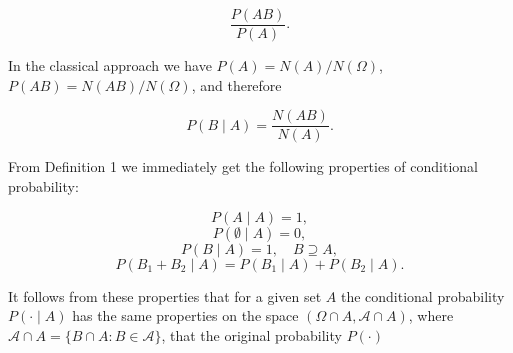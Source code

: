 $$\frac{P(AB)}{P(A)}.$$

In the classical approach we have $P(A) = N(A)/N(\Omega)$, $P(AB) = N(AB)/N(\Omega)$, and therefore

$$P(B \mid A) = \frac{N(AB)}{N(A)}.$$

From Definition 1 we immediately get the following properties of conditional probability:

$$P(A \mid A) = 1,$$
$$P(\emptyset \mid A) = 0,$$
$$P(B \mid A) = 1, \quad B \supseteq A,$$
$$P(B_1 + B_2 \mid A) = P(B_1 \mid A) + P(B_2 \mid A).$$

It follows from these properties that for a given set $A$ the conditional probability $P(\cdot \mid A)$ has the same properties on the space $(\Omega \cap A, \mathcal{A} \cap A)$, where $\mathcal{A} \cap A = \{B \cap A : B \in \mathcal{A}\}$, that the original probability $P(\cdot)$
